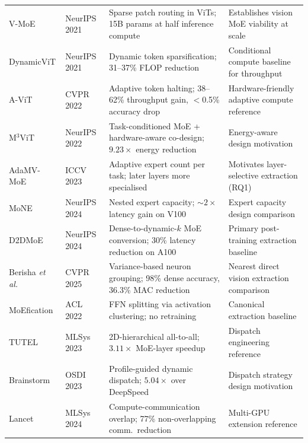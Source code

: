 \documentclass[12pt,a4paper]{article}
\newcommand{\etal}{\emph{et al.}}
\begin{document}
\begin{longtable}{p{3.0cm}p{2.0cm}p{4.5cm}p{4.5cm}}
V-MoE \cite{riquelme2021vmoe}            & NeurIPS 2021 & Sparse patch routing in ViTs; 15B params at half inference compute & Establishes vision MoE viability at scale \\
DynamicViT \cite{rao2021dynamicvit}       & NeurIPS 2021 & Dynamic token sparsification; 31--37\% FLOP reduction & Conditional compute baseline for throughput \\
A-ViT \cite{yin2022avit}                 & CVPR 2022    & Adaptive token halting; 38--62\% throughput gain, $<$0.5\% accuracy drop & Hardware-friendly adaptive compute reference \\
M$^3$ViT \cite{fan2022m3vit}             & NeurIPS 2022 & Task-conditioned MoE + hardware-aware co-design; $9.23\times$ energy reduction & Energy-aware design motivation \\
AdaMV-MoE \cite{chen2023adamvmoe}        & ICCV 2023    & Adaptive expert count per task; later layers more specialised & Motivates layer-selective extraction (RQ1) \\
MoNE \cite{mone2024}                     & NeurIPS 2024 & Nested expert capacity; $\sim\!2\times$ latency gain on V100 & Expert capacity design comparison \\
D2DMoE \cite{d2dmoe2024}                 & NeurIPS 2024 & Dense-to-dynamic-$k$ MoE conversion; 30\% latency reduction on A100 & Primary post-training extraction baseline \\
Berisha \etal\ \cite{berisha2025cvpr}     & CVPR 2025    & Variance-based neuron grouping; 98\% dense accuracy, 36.3\% MAC reduction & Nearest direct vision extraction comparison \\
MoEfication \cite{zhang2022moefication}  & ACL 2022     & FFN splitting via activation clustering; no retraining & Canonical extraction baseline \\
TUTEL \cite{hwang2023tutel}              & MLSys 2023   & 2D-hierarchical all-to-all; $3.11\times$ MoE-layer speedup & Dispatch engineering reference \\
Brainstorm \cite{brainstorm2023}         & OSDI 2023    & Profile-guided dynamic dispatch; $5.04\times$ over DeepSpeed & Dispatch strategy design motivation \\
Lancet \cite{lancet2024}                 & MLSys 2024   & Compute-communication overlap; 77\% non-overlapping comm.\ reduction & Multi-GPU extension reference \\

\end{longtable}
\end{document}
